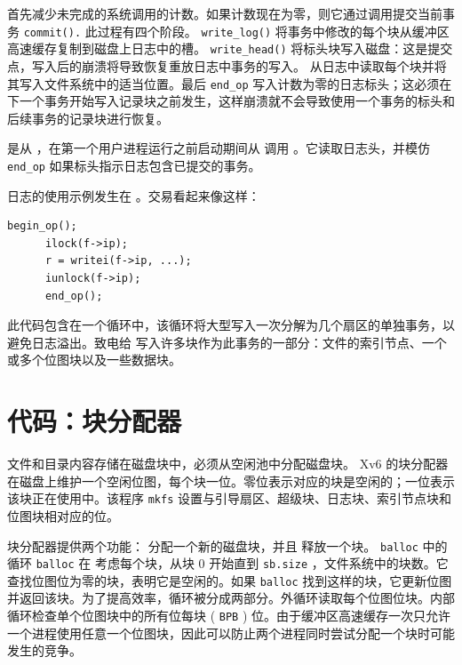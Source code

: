 \documentclass[UTF8]{article}
\begin{document}
        首先减少未完成的系统调用的计数。如果计数现在为零，则它通过调用提交当前事务
    \lstinline{commit().}    此过程有四个阶段。
    \lstinline{write_log()}   
        将事务中修改的每个块从缓冲区高速缓存复制到磁盘上日志中的槽。
    \lstinline{write_head()}   
        将标头块写入磁盘：这是提交点，写入后的崩溃将导致恢复重放日志中事务的写入。
        从日志中读取每个块并将其写入文件系统中的适当位置。最后
    \lstinline{end_op}    写入计数为零的日志标头；这必须在下一个事务开始写入记录块之前发生，这样崩溃就不会导致使用一个事务的标头和后续事务的记录块进行恢复。  

        是从
        ，在第一个用户进程运行之前启动期间从               调用
        。它读取日志头，并模仿
    \lstinline{end_op}    如果标头指示日志包含已提交的事务。  

日志的使用示例发生在
        。交易看起来像这样：
    \begin{lstlisting}[]
      begin_op();
      ilock(f->ip);
      r = writei(f->ip, ...);
      iunlock(f->ip);
      end_op();
\end{lstlisting}    此代码包含在一个循环中，该循环将大型写入一次分解为几个扇区的单独事务，以避免日志溢出。致电给
        写入许多块作为此事务的一部分：文件的索引节点、一个或多个位图块以及一些数据块。
    \section{代码：块分配器  }     

文件和目录内容存储在磁盘块中，必须从空闲池中分配磁盘块。 Xv6 的块分配器在磁盘上维护一个空闲位图，每个块一位。零位表示对应的块是空闲的；一位表示该块正在使用中。该程序
    \lstinline{mkfs}    设置与引导扇区、超级块、日志块、索引节点块和位图块相对应的位。  

块分配器提供两个功能：
        分配一个新的磁盘块，并且
        释放一个块。
    \lstinline{balloc}    中的循环
    \lstinline{balloc}    在
        考虑每个块，从块 0 开始直到
    \lstinline{sb.size}    ，文件系统中的块数。它查找位图位为零的块，表明它是空闲的。如果
    \lstinline{balloc}    找到这样的块，它更新位图并返回该块。为了提高效率，循环被分成两部分。外循环读取每个位图位块。内部循环检查单个位图块中的所有位每块 (    \lstinline{BPB}    ) 位。由于缓冲区高速缓存一次只允许一个进程使用任意一个位图块，因此可以防止两个进程同时尝试分配一个块时可能发生的竞争。  
\end{document}
